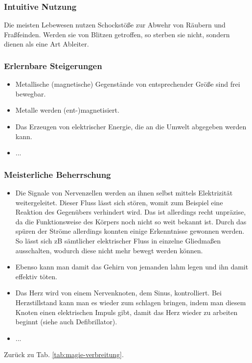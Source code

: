 \subsubsection{Intuitive Nutzung}
Die meisten Lebewesen nutzen Schockstöße zur Abwehr von Räubern und Fraßfeinden. Werden sie von Blitzen getroffen, so sterben sie nicht, sondern dienen als eine Art Ableiter. 

\subsubsection{Erlernbare Steigerungen}
\begin{itemize}
	\item Metallische (magnetische) Gegenstände von entsprechender Größe sind frei bewegbar.
	\item Metalle werden (ent-)magnetisiert.
	\item Das Erzeugen von elektrischer Energie, die an die Umwelt abgegeben werden kann.
	\item ...
\end{itemize}

\subsubsection{Meisterliche Beherrschung} 
\begin{itemize}
	\item Die Signale von Nervenzellen werden an ihnen selbst mittels Elektrizität weitergeleitet. Dieser Fluss lässt sich stören, womit zum Beispiel eine Reaktion des Gegenübers verhindert wird. Das ist allerdings recht unpräzise, da die Funktionsweise des Körpers noch nicht so weit bekannt ist. Durch das spüren der Ströme allerdings konnten einige Erkenntnisse gewonnen werden. So lässt sich zB sämtlicher elektrischer Fluss in einzelne Gliedmaßen ausschalten, wodurch diese nicht mehr bewegt werden können.
	\item Ebenso kann man damit das Gehirn von jemanden lahm legen und ihn damit effektiv töten.
	\item Das Herz wird von einem Nervenknoten, dem Sinus, kontrolliert. Bei Herzstillstand kann man es wieder zum schlagen bringen, indem man diesem Knoten einen elektrischen Impuls gibt, damit das Herz wieder zu arbeiten beginnt (siehe auch Defibrillator).
	\item ...
\end{itemize}
Zurück zu Tab. \ref{tab:magie-verbreitung}.



